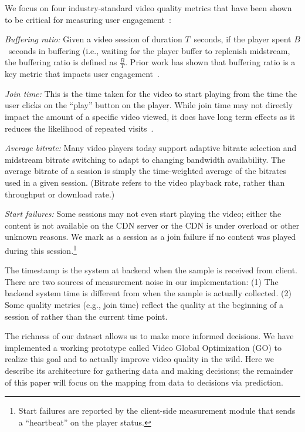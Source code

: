  We focus on four industry-standard video quality metrics that have been shown to be critical for measuring user engagement~\cite{sigcomm11}:
\begin{packedenumerate}
\item \emph{Buffering ratio:}  Given a video session of duration $T$~seconds,
if the player spent $B$~seconds in buffering (i.e., waiting for the player
 buffer to replenish midstream, the buffering ratio is defined as
 $\frac{B}{T}$. Prior work has shown that buffering ratio is a key metric
 that impacts user engagement~\cite{sigcomm11}.
\item \emph{Join time:}  This is the time taken for the video to start playing
 from the time the user clicks on the ``play'' button on the player.
 While join time may not directly impact the amount of a specific video viewed,
 it does have long term effects as it reduces the likelihood of repeated
visits~\cite{sigcomm11,akamai-imc12}.
\item \emph{Average bitrate:} Many video players today support adaptive bitrate
selection and midstream bitrate switching to adapt to changing bandwidth
availability. The average bitrate of a session is simply the time-weighted
average of the bitrates used in a given session. (Bitrate refers to the video playback rate, rather than throughput or download rate.)
\item \emph{Start failures:}   Some sessions may not even start playing the
video; either the content is not available on the CDN server or the CDN is
under overload or other unknown reasons. We mark as a session as a join failure
if no content was played during this session.\footnote{Start failures are
reported by the client-side measurement module that sends a ``heartbeat'' on
the player status.}
\end{packedenumerate}

 The timestamp is the system at backend when the sample is received from client. There are two sources of measurement noise in our implementation: (1) The backend system time is different from when the sample is actually collected. (2) Some quality metrics (e.g., join time) reflect the quality at the beginning of a session of rather than the current time point. 


 The richness of our dataset allows us to make more informed decisions. We have implemented a working prototype called Video Global Optimization (GO) to realize this goal and to actually improve video quality in the wild.  Here we describe its architecture for gathering data and making decisions; the remainder of this paper will focus on the mapping from data to decisions via prediction.

